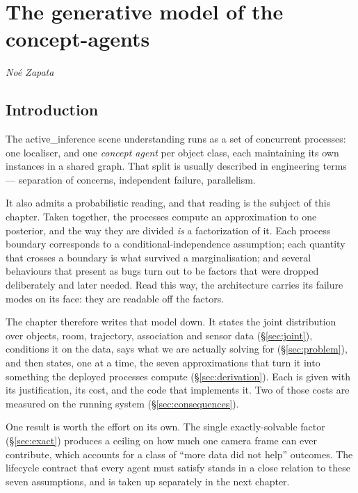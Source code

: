 \documentclass[11pt,a4paper]{report}
\theoremstyle{definition}   %
\begin{document}
\setcounter{chapter}{1}
\chapter{The generative model of the concept-agents}

\begin{flushleft}
\textit{No\'e Zapata}
\end{flushleft}

\vspace{4pt}

\section{Introduction}
\label{sec:intro}



The \textsf{active\_inference} scene understanding runs as a set of concurrent processes: one
localiser, and one \emph{concept agent} per object class, each maintaining its own instances in a
shared graph. That split is usually described in engineering terms --- separation of
concerns, independent failure, parallelism.

It also admits a probabilistic reading, and that reading is the subject of this chapter. Taken
together, the processes compute an approximation to one posterior, and the way they are divided
\emph{is} a factorization of it. Each process boundary corresponds to a conditional-independence
assumption; each quantity that crosses a boundary is what survived a marginalisation; and several
behaviours that present as bugs turn out to be factors that were dropped deliberately and later
needed. Read this way, the architecture carries its failure modes on its face: they are readable
off the factors.

The chapter therefore writes that model down. It states the joint distribution over objects, room,
trajectory, association and sensor data (\S\ref{sec:joint}), conditions it on the data, says what
we are actually solving for (\S\ref{sec:problem}), and then states, one at a time, the seven
approximations that turn it into something the deployed processes compute
(\S\ref{sec:derivation}). Each is given with its justification, its cost, and the code that
implements it. Two of those costs are measured on the running system (\S\ref{sec:consequences}).

One result is worth the effort on its own. The single exactly-solvable factor
(\S\ref{sec:exact}) produces a ceiling on how much one camera frame can ever contribute, which
accounts for a class of ``more data did not help'' outcomes. The lifecycle contract that every
agent must satisfy stands in a close relation to these seven assumptions, and is taken up
separately in the next chapter.
\end{document}
